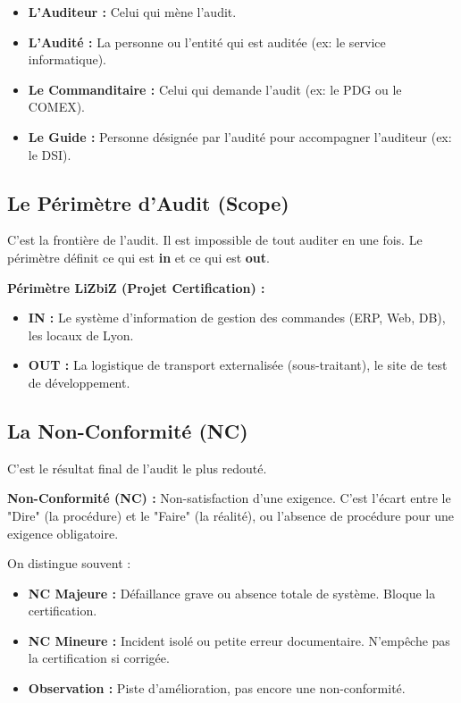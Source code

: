 \begin{itemize}
    \item \textbf{L'Auditeur :} Celui qui mène l'audit.
    \item \textbf{L'Audité :} La personne ou l'entité qui est auditée (ex: le service informatique).
    \item \textbf{Le Commanditaire :} Celui qui demande l'audit (ex: le PDG ou le COMEX).
    \item \textbf{Le Guide :} Personne désignée par l'audité pour accompagner l'auditeur (ex: le DSI).
\end{itemize}

\subsection{Le Périmètre d'Audit (Scope)}

C'est la frontière de l'audit. Il est impossible de tout auditer en une fois. Le périmètre définit ce qui est \textbf{in} et ce qui est \textbf{out}.

\begin{boxlizbiz}
\textbf{Périmètre LiZbiZ (Projet Certification) :}
\begin{itemize}
    \item \textbf{IN :} Le système d'information de gestion des commandes (ERP, Web, DB), les locaux de Lyon.
    \item \textbf{OUT :} La logistique de transport externalisée (sous-traitant), le site de test de développement.
\end{itemize}
\end{boxlizbiz}

\subsection{La Non-Conformité (NC)}

C'est le résultat final de l'audit le plus redouté.

\begin{boxdef}
\textbf{Non-Conformité (NC) :} Non-satisfaction d'une exigence. C'est l'écart entre le "Dire" (la procédure) et le "Faire" (la réalité), ou l'absence de procédure pour une exigence obligatoire.
\end{boxdef}

On distingue souvent :
\begin{itemize}
    \item \textbf{NC Majeure :} Défaillance grave ou absence totale de système. Bloque la certification.
    \item \textbf{NC Mineure :} Incident isolé ou petite erreur documentaire. N'empêche pas la certification si corrigée.
    \item \textbf{Observation :} Piste d'amélioration, pas encore une non-conformité.
\end{itemize}

